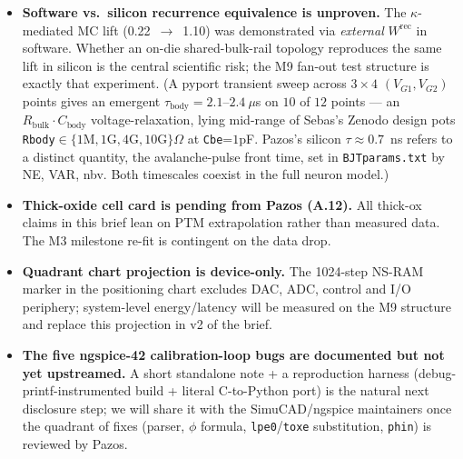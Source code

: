 \documentclass[fontsize=10pt]{article}
\begin{document}
\begin{itemize}
    (5 seeds, $20\%$ bit-flip corruption). Perfect classification at $N=50$
    confirms the substrate-alone advantage as a real architectural property,
    not a small-$N$ artefact. \emph{$M$-scaling at $N=50$:} graceful
    degradation across stored-pattern count --- $M=3 \to 1.000$, $M=5 \to 0.988$,
    $M=10 \to 0.936$, $M=15 \to 0.874$, $M=20 \to \mathbf{0.854 \pm 0.036}$,
    with ratio-vs-chance \emph{growing} monotonically from $3\times$ to
    $17\times$. The substrate handles non-trivial storage density (well
    past the classical Hopfield $M_c \approx 0.14N \approx 7$ capacity for
    orthogonal patterns) without a cliff. Phase B extends to $M{=}30, 50$
    to locate the eventual cutoff.
  \item \textbf{Software vs.\ silicon recurrence equivalence is unproven.}
    The $\kappa$-mediated MC lift (0.22~$\to$~1.10) was demonstrated via
    \emph{external} $W^{\mathrm{rec}}$ in software. Whether an on-die
    shared-bulk-rail topology reproduces the same lift in silicon is the
    central scientific risk; the M9 fan-out test structure is exactly that
    experiment. (A pyport transient sweep across $3 \times 4$
    $(V_{G1}, V_{G2})$ points gives an emergent
    $\tau_{\mathrm{body}} = 2.1$--$2.4~\mu$s on $10$ of $12$ points
    --- an $R_{\mathrm{bulk}}\!\cdot\!C_{\mathrm{body}}$
    voltage-relaxation, lying mid-range of Sebas's Zenodo design pots
    \texttt{Rbody}$\in\{1\mathrm{M},1\mathrm{G},4\mathrm{G},
    10\mathrm{G}\}\Omega$ at \texttt{Cbe}=$1$pF. Pazos's silicon
    $\tau \approx 0.7$~ns refers to a distinct quantity, the
    avalanche-pulse front time, set in \texttt{BJTparams.txt} by NE,
    VAR, nbv. Both timescales coexist in the full neuron model.)
  \item \textbf{Thick-oxide cell card is pending from Pazos (A.12).}
    All thick-ox claims in this brief lean on PTM extrapolation rather than
    measured data. The M3 milestone re-fit is contingent on the data drop.
  \item \textbf{Quadrant chart projection is device-only.} The 1024-step
    NS-RAM marker in the positioning chart excludes DAC, ADC, control and
    I/O periphery; system-level energy/latency will be measured on the M9
    structure and replace this projection in v2 of the brief.
  \item \textbf{The five ngspice-42 calibration-loop bugs are documented but
    not yet upstreamed.} A short standalone note + a reproduction harness
    (debug-printf-instrumented build + literal C-to-Python port) is the
    natural next disclosure step; we will share it with the SimuCAD/ngspice
    maintainers once the quadrant of fixes (parser, $\phi$ formula,
    \texttt{lpe0}/\texttt{toxe} substitution, \texttt{phin}) is reviewed by
    Pazos.
\end{itemize}
\end{document}
